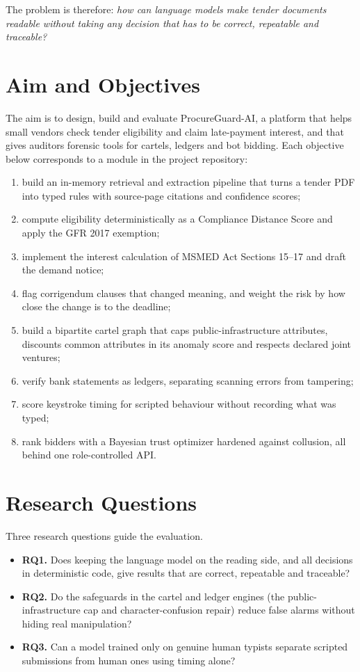 The problem is therefore: \emph{how can language models make tender documents readable without taking any decision that has to be correct, repeatable and traceable?}

\section{Aim and Objectives}
The aim is to design, build and evaluate ProcureGuard-AI, a platform that helps small vendors check tender eligibility and claim late-payment interest, and that gives auditors forensic tools for cartels, ledgers and bot bidding. Each objective below corresponds to a module in the project repository:

\begin{enumerate}
    \item build an in-memory retrieval and extraction pipeline that turns a tender PDF into typed rules with source-page citations and confidence scores;
    \item compute eligibility deterministically as a Compliance Distance Score and apply the GFR 2017 exemption;
    \item implement the interest calculation of MSMED Act Sections 15--17 and draft the demand notice;
    \item flag corrigendum clauses that changed meaning, and weight the risk by how close the change is to the deadline;
    \item build a bipartite cartel graph that caps public-infrastructure attributes, discounts common attributes in its anomaly score and respects declared joint ventures;
    \item verify bank statements as ledgers, separating scanning errors from tampering;
    \item score keystroke timing for scripted behaviour without recording what was typed;
    \item rank bidders with a Bayesian trust optimizer hardened against collusion, all behind one role-controlled API.
\end{enumerate}

\section{Research Questions}
Three research questions guide the evaluation.
\begin{itemize}
    \item \textbf{RQ1.} Does keeping the language model on the reading side, and all decisions in deterministic code, give results that are correct, repeatable and traceable?
    \item \textbf{RQ2.} Do the safeguards in the cartel and ledger engines (the public-infrastructure cap and character-confusion repair) reduce false alarms without hiding real manipulation?
    \item \textbf{RQ3.} Can a model trained only on genuine human typists separate scripted submissions from human ones using timing alone?
\end{itemize}

